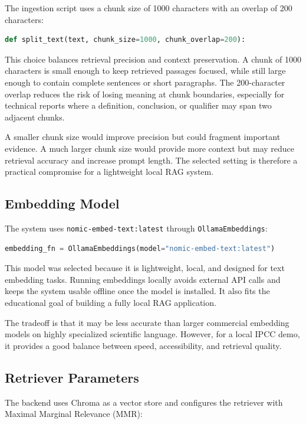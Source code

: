 \documentclass[11pt,a4paper]{article}
\begin{document}
The ingestion script uses a chunk size of 1000 characters with an overlap of 200 characters:

\begin{lstlisting}[language=Python]
def split_text(text, chunk_size=1000, chunk_overlap=200):
\end{lstlisting}

This choice balances retrieval precision and context preservation. A chunk of 1000 characters is small enough to keep retrieved passages focused, while still large enough to contain complete sentences or short paragraphs. The 200-character overlap reduces the risk of losing meaning at chunk boundaries, especially for technical reports where a definition, conclusion, or qualifier may span two adjacent chunks.

A smaller chunk size would improve precision but could fragment important evidence. A much larger chunk size would provide more context but may reduce retrieval accuracy and increase prompt length. The selected setting is therefore a practical compromise for a lightweight local RAG system.

\subsection{Embedding Model}

The system uses \texttt{nomic-embed-text:latest} through \texttt{OllamaEmbeddings}:

\begin{lstlisting}[language=Python]
embedding_fn = OllamaEmbeddings(model="nomic-embed-text:latest")
\end{lstlisting}

This model was selected because it is lightweight, local, and designed for text embedding tasks. Running embeddings locally avoids external API calls and keeps the system usable offline once the model is installed. It also fits the educational goal of building a fully local RAG application.

The tradeoff is that it may be less accurate than larger commercial embedding models on highly specialized scientific language. However, for a local IPCC demo, it provides a good balance between speed, accessibility, and retrieval quality.

\subsection{Retriever Parameters}

The backend uses Chroma as a vector store and configures the retriever with Maximal Marginal Relevance (MMR):
\end{document}
